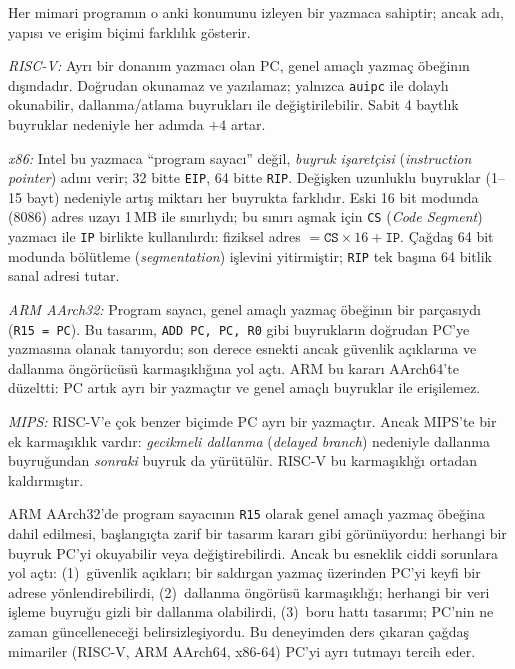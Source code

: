 \begin{karsilastirma}
Her mimari programın o anki konumunu izleyen bir yazmaca sahiptir; ancak adı, yapısı ve erişim biçimi farklılık gösterir.

\emph{RISC-V:} Ayrı bir donanım yazmacı olan PC, genel amaçlı yazmaç öbeğinın dışındadır. Doğrudan okunamaz ve yazılamaz; yalnızca \texttt{auipc} ile dolaylı okunabilir, dallanma/atlama buyrukları ile değiştirilebilir. Sabit 4 baytlık buyruklar nedeniyle her adımda $+4$ artar.

\emph{x86:} Intel bu yazmaca ``program sayacı'' değil, \emph{buyruk işaretçisi} (\emph{instruction pointer}) adını verir; 32 bitte \texttt{EIP}, 64 bitte \texttt{RIP}. Değişken uzunluklu buyruklar (1--15 bayt) nedeniyle artış miktarı her buyrukta farklıdır. Eski 16 bit modunda (8086) adres uzayı 1\,MB ile sınırlıydı; bu sınırı aşmak için \texttt{CS} (\emph{Code Segment}) yazmacı ile \texttt{IP} birlikte kullanılırdı: fiziksel adres $= \texttt{CS} \times 16 + \texttt{IP}$. Çağdaş 64 bit modunda bölütleme (\emph{segmentation}) işlevini yitirmiştir; \texttt{RIP} tek başına 64 bitlik sanal adresi tutar.

\emph{ARM AArch32:} Program sayacı, genel amaçlı yazmaç öbeğinın bir parçasıydı (\texttt{R15 = PC}). Bu tasarım, \texttt{ADD PC, PC, R0} gibi buyrukların doğrudan PC'ye yazmasına olanak tanıyordu; son derece esnekti ancak güvenlik açıklarına ve dallanma öngörücüsü karmaşıklığına yol açtı. ARM bu kararı AArch64'te düzeltti: PC artık ayrı bir yazmaçtır ve genel amaçlı buyruklar ile erişilemez.

\emph{MIPS:} RISC-V'e çok benzer biçimde PC ayrı bir yazmaçtır. Ancak MIPS'te bir ek karmaşıklık vardır: \emph{gecikmeli dallanma} (\emph{delayed branch}) nedeniyle dallanma buyruğundan \emph{sonraki} buyruk da yürütülür. RISC-V bu karmaşıklığı ortadan kaldırmıştır.
\end{karsilastirma}

\begin{bilginot}
ARM AArch32'de program sayacının \texttt{R15} olarak genel amaçlı yazmaç öbeğina dahil edilmesi, başlangıçta zarif bir tasarım kararı gibi görünüyordu: herhangi bir buyruk PC'yi okuyabilir veya değiştirebilirdi. Ancak bu esneklik ciddi sorunlara yol açtı: (1)~güvenlik açıkları; bir saldırgan yazmaç üzerinden PC'yi keyfi bir adrese yönlendirebilirdi, (2)~dallanma öngörüsü karmaşıklığı; herhangi bir veri işleme buyruğu gizli bir dallanma olabilirdi, (3)~boru hattı tasarımı; PC'nin ne zaman güncelleneceği belirsizleşiyordu. Bu deneyimden ders çıkaran çağdaş mimariler (RISC-V, ARM AArch64, x86-64) PC'yi ayrı tutmayı tercih eder.
\end{bilginot}

